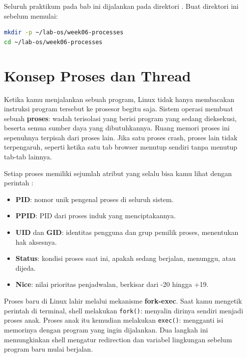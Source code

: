 \begin{notebox}
Seluruh praktikum pada bab ini dijalankan pada direktori .
Buat direktori ini sebelum memulai:
\begin{lstlisting}[language=bash]
mkdir -p ~/lab-os/week06-processes
cd ~/lab-os/week06-processes
\end{lstlisting}
\end{notebox}

\section{Konsep Proses dan Thread}
\label{sec:process-concept}

Ketika kamu menjalankan sebuah program, Linux tidak hanya membacakan instruksi program
tersebut ke prosesor begitu saja. Sistem operasi membuat sebuah \textbf{proses}: wadah
terisolasi yang berisi program yang sedang dieksekusi, beserta semua sumber daya yang
dibutuhkannya. Ruang memori proses ini sepenuhnya terpisah dari proses lain. Jika satu
proses crash, proses lain tidak terpengaruh, seperti ketika satu tab browser menutup
sendiri tanpa menutup tab-tab lainnya.

Setiap proses memiliki sejumlah atribut yang selalu bisa kamu lihat dengan perintah
:

\begin{itemize}
    \item \textbf{PID}: nomor unik pengenal proses di seluruh sistem.
    \item \textbf{PPID}: PID dari proses induk yang menciptakannya.
    \item \textbf{UID} dan \textbf{GID}: identitas pengguna dan grup pemilik proses, menentukan hak aksesnya.
    \item \textbf{Status}: kondisi proses saat ini, apakah sedang berjalan, menunggu, atau dijeda.
    \item \textbf{Nice}: nilai prioritas penjadwalan, berkisar dari -20 hingga +19.
\end{itemize}

Proses baru di Linux lahir melalui mekanisme \textbf{fork-exec}. Saat kamu mengetik
perintah di terminal, shell melakukan \texttt{fork()}: menyalin dirinya sendiri menjadi
proses anak. Proses anak itu kemudian melakukan \texttt{exec()}: mengganti isi memorinya
dengan program yang ingin dijalankan. Dua langkah ini memungkinkan shell mengatur
redirection dan variabel lingkungan sebelum program baru mulai berjalan.


